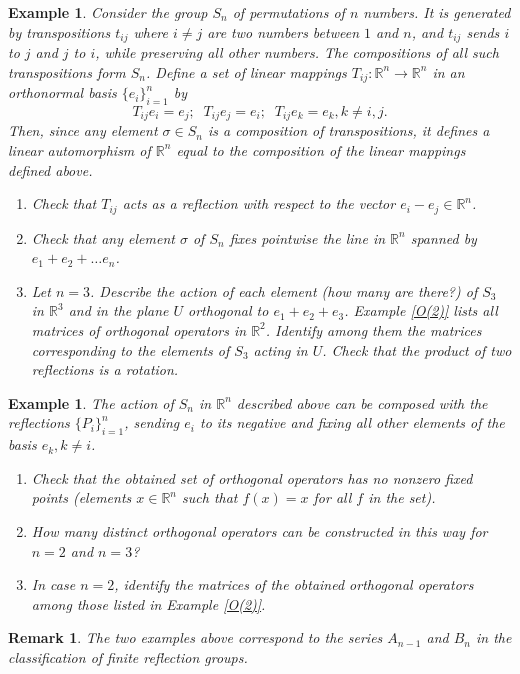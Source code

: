 \documentclass[11pt]{amsart}
\newcommand{\R}{\mathbb R}
\newtheorem{remark}[theorem]{Remark}
\newtheorem{example}[theorem]{Example}
\begin{document}
\begin{example} Consider the group $S_n$ of permutations 
of $n$ numbers. It is generated by transpositions $t_{ij}$ where 
$i \neq j$ are two numbers between $1$ and $n$, and $t_{ij}$ sends 
$i$ to $j $ and $j $ to $i$, while preserving all other numbers. The 
compositions of all such transpositions form $S_n$. Define a set 
of linear mappings $T_{ij} : \R^n \to \R^n$ in an  
orthonormal basis $\{e_i \}_{i=1}^n$ by 
$$T_{ij} e_i = e_j ; \;\; T_{ij} e_j = e_i; \;\; T_{ij}e_k =e_k, k \neq i,j.$$ 
Then, since any element $\sigma \in S_n$ is a composition of transpositions, 
it defines a linear automorphism of $ \R^n$ equal to the composition 
of the linear mappings defined above. 
\begin{enumerate} 
\item{Check that $T_{ij}$ acts as a reflection with respect to the vector 
$e_i -e_j \in \R^n$. }
\item{Check that any element $\sigma$ of $S_n$ fixes pointwise the line 
in $\R^n$ spanned by $e_1 + e_2 + \ldots e_n$.} 
\item{Let $n=3$. Describe the action of each element (how many are there?) 
of $S_3$ in $\R^3$ and in the plane $U$ orthogonal to $e_1 + e_2 + e_3$. 
Example \ref{O(2)} lists all matrices of orthogonal operators in $\R^2$. 
Identify among them the matrices corresponding to the elements 
of $S_3$ acting in $U$. Check that the product of two reflections is 
a rotation.} 
\end{enumerate} 
\end{example} 

\begin{example} The action of $S_n$ in $\R^n$ described above can 
be composed with the reflections $\{P_i\}_{i=1}^n$, 
sending $e_i $ to its negative and fixing 
all other elements of the basis $e_k, k \neq i$. 
\begin{enumerate} 
\item{
Check that the obtained 
set of orthogonal operators has no nonzero fixed points (elements  
$x \in \R^n$ such that $f(x)=x$ for all $f$ in the set).}
\item{ How many distinct orthogonal operators can 
be constructed in this way for $n=2$ and $n =3$?}
\item{ In case $n=2$, identify 
the matrices of the obtained orthogonal operators among those listed in 
Example \ref{O(2)}. }
\end{enumerate}
\end{example} 

\begin{remark}
The two examples above correspond to the series $A_{n-1}$ and $B_n$ in 
the classification of finite reflection groups. 
\end{remark} 
 
\end{document}
